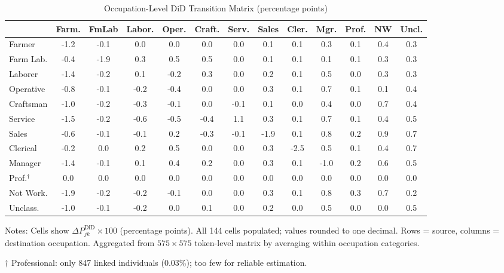 \documentclass[12pt]{article}
\begin{document}
\begin{table}[H]
\centering
\caption{Occupation-Level DiD Transition Matrix (percentage points)}
\label{tab:did_matrix}
\begin{adjustbox}{max width=\textwidth}
\begin{threeparttable}
\begin{tabular}{l*{12}{S[table-format=-1.1,table-auto-round]}}
\toprule
& {Farm.} & {FmLab} & {Labor.} & {Oper.} & {Craft.} & {Serv.} & {Sales} & {Cler.} & {Mgr.} & {Prof.} & {NW} & {Uncl.} \\
\midrule
Farmer     & -1.2 & -0.1 &  0.0 &  0.0 &  0.0 &  0.0 & 0.1 & 0.1 & 0.3 & 0.1 & 0.4 & 0.3 \\
Farm Lab.  & -0.4 & -1.9 &  0.3 &  0.5 &  0.5 &  0.0 & 0.1 & 0.1 & 0.1 & 0.1 & 0.3 & 0.3 \\
Laborer    & -1.4 & -0.2 &  0.1 & -0.2 &  0.3 &  0.0 & 0.2 & 0.1 & 0.5 & 0.0 & 0.3 & 0.3 \\
Operative  & -0.8 & -0.1 & -0.2 & -0.4 &  0.0 &  0.0 & 0.3 & 0.1 & 0.7 & 0.1 & 0.1 & 0.4 \\
Craftsman  & -1.0 & -0.2 & -0.3 & -0.1 &  0.0 & -0.1 & 0.1 & 0.0 & 0.4 & 0.0 & 0.7 & 0.4 \\
Service    & -1.5 & -0.2 & -0.6 & -0.5 & -0.4 &  1.1 & 0.3 & 0.1 & 0.7 & 0.1 & 0.4 & 0.5 \\
Sales      & -0.6 & -0.1 & -0.1 &  0.2 & -0.3 & -0.1 &-1.9 & 0.1 & 0.8 & 0.2 & 0.9 & 0.7 \\
Clerical   & -0.2 &  0.0 &  0.2 &  0.5 &  0.0 &  0.0 & 0.3 &-2.5 & 0.5 & 0.1 & 0.4 & 0.7 \\
Manager    & -1.4 & -0.1 &  0.1 &  0.4 &  0.2 &  0.0 & 0.3 & 0.1 &-1.0 & 0.2 & 0.6 & 0.5 \\
Prof.$^\dagger$ &  0.0 &  0.0 &  0.0 &  0.0 &  0.0 &  0.0 & 0.0 & 0.0 & 0.0 & 0.0 & 0.0 & 0.0 \\
Not Work.  & -1.9 & -0.2 & -0.2 & -0.1 &  0.0 &  0.0 & 0.3 & 0.1 & 0.8 & 0.3 & 0.7 & 0.2 \\
Unclass.   & -1.0 & -0.1 & -0.2 &  0.0 &  0.1 &  0.0 & 0.2 & 0.0 & 0.5 & 0.0 & 0.0 & 0.5 \\
\bottomrule
\end{tabular}
\begin{tablenotes}[flushleft]
\small
\item Notes: Cells show $\Delta P_{jk}^{\text{DiD}} \times 100$ (percentage points). All 144 cells populated; values rounded to one decimal. Rows = source, columns = destination occupation. Aggregated from $575 \times 575$ token-level matrix by averaging within occupation categories.
\item[$\dagger$] Professional: only 847 linked individuals (0.03\%); too few for reliable estimation.
\end{tablenotes}
\end{threeparttable}
\end{adjustbox}
\end{table}
\end{document}
